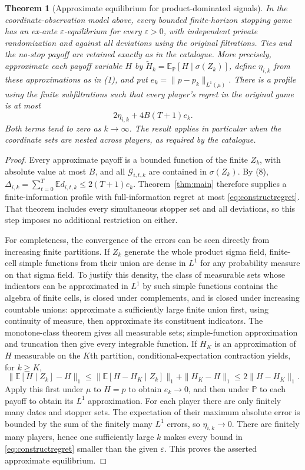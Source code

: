 \documentclass[11pt]{article}
\newtheorem{theorem}{Theorem}
\theoremstyle{remark}\newtheorem{remark}[theorem]{Remark}
\newcommand{\E}{\mathbb E}
\newcommand{\Prb}{\mathbb P}
\begin{document}
\begin{theorem}[Approximate equilibrium for product-dominated signals]
\label{thm:construct}
In the coordinate-observation model above, every bounded finite-horizon
stopping game has an ex-ante $\varepsilon$-equilibrium for every
$\varepsilon>0$, with independent private randomization and against all
deviations using the original filtrations. Ties and the no-stop payoff
are retained exactly as in the catalogue.
More precisely, approximate each payoff variable $H$ by
$\widetilde H_k=\E_{\Prb}[H\mid\sigma(Z_k)]$, define $\eta_{i,k}$
from these approximations as in (1), and put $e_k=\|p-p_k\|_{L^1(\mu)}$.
There is a profile using the finite subfiltrations such that every
player's regret in the original game is at most
\begin{equation}\label{eq:constructregret}
 2\eta_{i,k}+4B(T+1)e_k.
\end{equation}
Both terms tend to zero as $k\to\infty$.
The result applies in particular when the coordinate sets are nested
across players, as required by the catalogue.
\end{theorem}
\begin{proof}
Every approximate payoff is a bounded function of the finite $Z_k$,
with absolute value at most $B$, and all $\mathcal G_{i,t,k}$ are
contained in $\sigma(Z_k)$. By (8),
$\Delta_{i,k}=\sum_{t=0}^T\E d_{i,t,k}\leq2(T+1)e_k$.
Theorem~\ref{thm:main} therefore supplies a finite-information profile
with full-information regret at most \eqref{eq:constructregret}.
That theorem includes every simultaneous stopper set and all deviations,
so this step imposes no additional restriction on either.

For completeness, the convergence of the errors can be seen directly
from increasing finite partitions. If $Z_k$ generate the whole product
sigma field, finite-cell simple functions from their union are dense
in $L^1$ for any probability measure on that sigma field. To justify
this density, the class of measurable sets whose indicators can be
approximated in $L^1$ by such simple functions contains the algebra of
finite cells, is closed under complements, and is closed under increasing
countable unions: approximate a sufficiently large finite union first,
using continuity of measure, then approximate its constituent indicators.
The monotone-class theorem gives all measurable sets; simple-function
approximation and truncation then give every integrable function.
If $H_K$ is an approximation of $H$ measurable on the $K$th partition,
conditional-expectation contraction yields, for $k\geq K$,
\[
 \|\E[H\mid Z_k]-H\|_1
 \leq\|\E[H-H_K\mid Z_k]\|_1+\|H_K-H\|_1
 \leq2\|H-H_K\|_1.
\]
Apply this first under $\mu$ to $H=p$ to obtain $e_k\to0$,
and then under $\Prb$ to each payoff to obtain its $L^1$ approximation.
For each player there are only finitely many dates and stopper sets.
The expectation of their maximum absolute error is bounded by the sum
of the finitely many $L^1$ errors, so $\eta_{i,k}\to0$.
There are finitely many players, hence one sufficiently large $k$
makes every bound in \eqref{eq:constructregret} smaller than the given
$\varepsilon$. This proves the asserted approximate equilibrium.
\end{proof}
\end{document}
